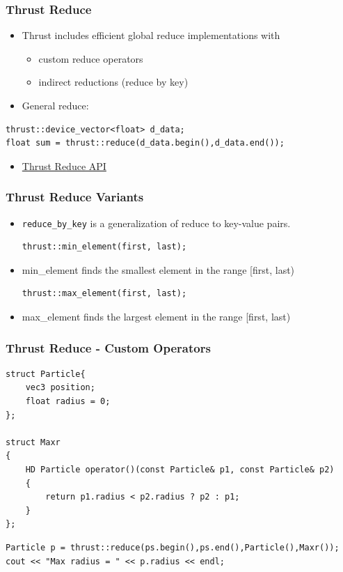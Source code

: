 \documentclass[aspectratio=169]{beamer}
\begin{document}
\begin{frame}[fragile]
\frametitle{Thrust Reduce}
\begin{itemize}
	\item Thrust includes efficient global reduce implementations with
	\begin{itemize}
		\item custom reduce operators
		\item indirect reductions (reduce by key)
	\end{itemize}
	\item General reduce:
\end{itemize}
\begin{lstlisting}
thrust::device_vector<float> d_data;
float sum = thrust::reduce(d_data.begin(),d_data.end());
\end{lstlisting}
\begin{itemize}
	\item \href{https://thrust.github.io/doc/group__reductions.html}{Thrust Reduce API}
	
\end{itemize}
\end{frame}


\begin{frame}[fragile]
\frametitle{Thrust Reduce Variants}

\begin{itemize}
\begin{lstlisting}
thrust::reduce_by_key(keys_first, keys_last, values_first, 
		keys_output, values_output);		
\end{lstlisting}
	\item \texttt{reduce\_by\_key} is a generalization of reduce to key-value pairs.
\begin{lstlisting}
thrust::min_element(first, last);		
\end{lstlisting}	
	\item min\_element finds the smallest element in the range [first, last)
\begin{lstlisting}
thrust::max_element(first, last);		
\end{lstlisting}	
	\item max\_element finds the largest element in the range [first, last)
\end{itemize}
\end{frame}

\begin{frame}[fragile]
\frametitle{Thrust Reduce - Custom Operators}

\begin{lstlisting}
struct Particle{
	vec3 position;
	float radius = 0;
};

struct Maxr
{
	HD Particle operator()(const Particle& p1, const Particle& p2)
	{
		return p1.radius < p2.radius ? p2 : p1;
	}
};

\end{lstlisting}

\begin{lstlisting}
Particle p = thrust::reduce(ps.begin(),ps.end(),Particle(),Maxr());
cout << "Max radius = " << p.radius << endl;
\end{lstlisting}
\end{frame}
\end{document}
